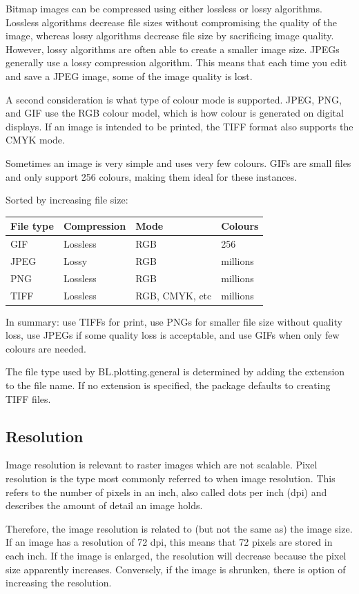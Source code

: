 \documentclass[letterpaper]{article}\usepackage[]{graphicx}\usepackage[]{color}
\begin{document}
Bitmap images can be compressed using either lossless or lossy algorithms. Lossless algorithms decrease file sizes without compromising the quality of the image, whereas lossy algorithms decrease file size by sacrificing image quality. However, lossy algorithms are often able to create a smaller image size. JPEGs generally use a lossy compression algorithm. This means that each time you edit and save a JPEG image, some of the image quality is lost. 

A second consideration is what type of colour mode is supported. JPEG, PNG, and GIF use the RGB colour model, which is how colour is generated on digital displays. If an image is intended to be printed, the TIFF format also supports the CMYK mode.

Sometimes an image is very simple and uses very few colours. GIFs are small files and only support 256 colours, making them ideal for these instances.

Sorted by increasing file size:
\begin{center}
\begin{tabular}{l l l l }
\hline
File type & Compression & Mode & Colours \\
\hline
GIF & Lossless & RGB & 256 \\
JPEG &  Lossy & RGB & millions\\
PNG &Lossless & RGB &  millions \\
TIFF & Lossless & RGB, CMYK, etc & millions \\
\end{tabular}
\end{center}
\bigskip
In summary: use TIFFs for print, use PNGs for smaller file size without quality loss, use JPEGs if some quality loss is acceptable, and use GIFs when only few colours are needed.

The file type used by BL.plotting.general is determined by adding the extension to the file name. If no extension is specified, the package defaults to creating TIFF files.

\subsection{Resolution}
Image resolution is relevant to raster images which are not scalable. Pixel resolution is the type most commonly referred to when image resolution. This refers to the number of pixels in an inch, also called dots per inch (dpi) and describes the amount of detail an image holds.

Therefore, the image resolution is related to (but not the same as) the image size. If an image has a resolution of 72 dpi, this means that 72 pixels are stored in each inch. If the image is enlarged, the resolution will decrease because the pixel size apparently increases. Conversely, if the image is shrunken, there is option of increasing the resolution.
\end{document}

